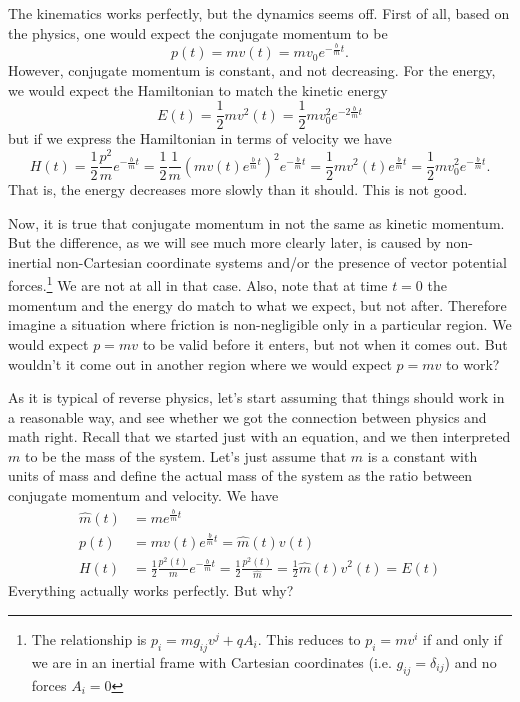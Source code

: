 The kinematics works perfectly, but the dynamics seems off. First of all, based on the physics, one would expect the conjugate momentum to be
\begin{equation}
	p(t)=m v(t) = m v_0 e^{-\frac{b}{m}t}.
\end{equation}
However, conjugate momentum is constant, and not decreasing. For the energy, we would expect the Hamiltonian to match the kinetic energy
\begin{equation}
	E(t)=\frac{1}{2} m v^2(t) = \frac{1}{2} m v_0^2 e^{-2\frac{b}{m}t}
\end{equation}
but if we express the Hamiltonian in terms of velocity we have
\begin{equation}
	H(t)=\frac{1}{2} \frac{p^2}{m} e^{-\frac{b}{m}t} = \frac{1}{2} \frac{1}{m} \left( m v(t) e^{\frac{b}{m}t} \right)^2 e^{-\frac{b}{m}t}= \frac{1}{2} m v^2(t) e^{\frac{b}{m}t} = \frac{1}{2} m v_0^2 e^{-\frac{b}{m}t}.
\end{equation}
That is, the energy decreases more slowly than it should. This is not good.

Now, it is true that conjugate momentum in not the same as kinetic momentum. But the difference, as we will see much more clearly later, is caused by non-inertial non-Cartesian coordinate systems and/or the presence of vector potential forces.\footnote{The relationship is $p_i = m g_{ij} v^j + q A_i$. This reduces to $p_i = m v^i$ if and only if we are in an inertial frame with Cartesian coordinates (i.e. $g_{ij}=\delta_{ij}$) and no forces $A_i = 0$} We are not at all in that case. Also, note that at time $t=0$ the momentum and the energy do match to what we expect, but not after. Therefore imagine a situation where friction is non-negligible only in a particular region. We would expect $p=mv$ to be valid before it enters, but not when it comes out. But wouldn't it come out in another region where we would expect $p=mv$ to work?

As it is typical of reverse physics, let's start assuming that things should work in a reasonable way, and see whether we got the connection between physics and math right. Recall that we started just with an equation, and we then interpreted $m$ to be the mass of the system. Let's just assume that $m$ is a constant with units of mass and define the actual mass of the system as the ratio between conjugate momentum and velocity. We have 
\begin{equation}
	\begin{aligned}
	\hat{m}(t) &= m e^{\frac{b}{m}t} \\
	p(t) &= mv(t)e^{\frac{b}{m}t} = \hat{m}(t) v(t) \\
	H(t) &= \frac{1}{2} \frac{p^2(t)}{m}  e^{-\frac{b}{m}t} = \frac{1}{2} \frac{p^2(t)}{\hat{m}} = \frac{1}{2} \hat{m}(t) v^2(t) = E(t)
	\end{aligned}
\end{equation}
Everything actually works perfectly. But why?

